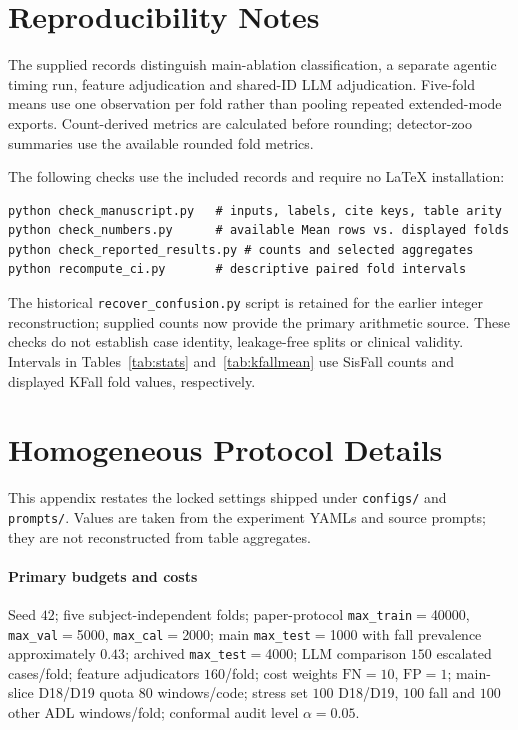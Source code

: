 \documentclass[journal]{IEEEtran}
\begin{document}
\appendices

\section{Reproducibility Notes}
\label{app:repro}
The supplied records distinguish main-ablation classification, a separate
agentic timing run, feature adjudication and shared-ID LLM adjudication.
Five-fold means use one observation per fold rather than pooling repeated
extended-mode exports. Count-derived metrics are calculated before rounding;
detector-zoo summaries use the available rounded fold metrics.

The following checks use the included records and require no LaTeX installation:
\begin{verbatim}
python check_manuscript.py   # inputs, labels, cite keys, table arity
python check_numbers.py      # available Mean rows vs. displayed folds
python check_reported_results.py # counts and selected aggregates
python recompute_ci.py       # descriptive paired fold intervals
\end{verbatim}
The historical \texttt{recover\_confusion.py} script is retained for the earlier
integer reconstruction; supplied counts now provide the primary arithmetic
source. These checks do not establish case identity, leakage-free splits or
clinical validity. Intervals in Tables~\ref{tab:stats} and~\ref{tab:kfallmean}
use SisFall counts and displayed KFall fold values, respectively.

\section{Homogeneous Protocol Details}
\label{app:protocol}
This appendix restates the locked settings shipped under \texttt{configs/}
and \texttt{prompts/}. Values are taken from the experiment YAMLs and source
prompts; they are not reconstructed from table aggregates.

\paragraph{Primary budgets and costs}
Seed $42$; five subject-independent folds; paper-protocol
\texttt{max\_train}${}={}$40000, \texttt{max\_val}${}={}$5000,
\texttt{max\_cal}${}={}$2000; main \texttt{max\_test}${}={}$1000 with fall
prevalence approximately $0.43$; archived \texttt{max\_test}${}={}$4000;
LLM comparison $150$ escalated cases/fold; feature adjudicators $160$/fold;
cost weights $\mathrm{FN}{=}10$, $\mathrm{FP}{=}1$; main-slice D18/D19 quota
$80$ windows/code; stress set $100$ D18/D19, $100$ fall and $100$ other ADL
windows/fold; conformal audit level $\alpha{=}0.05$.
\end{document}
